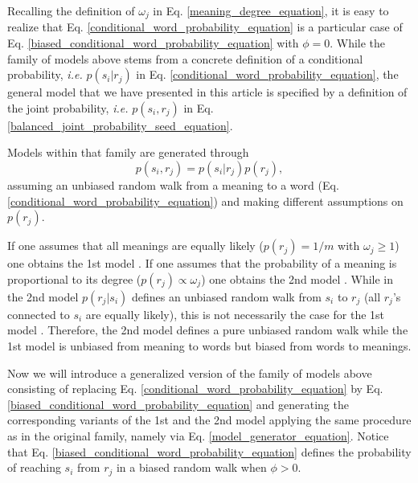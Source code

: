 \documentclass{article}
\begin{document}
Recalling the definition of $\omega_j$ in Eq. \ref{meaning_degree_equation}, it is easy to realize that Eq. \ref{conditional_word_probability_equation} is a particular case of Eq. \ref{biased_conditional_word_probability_equation} with $\phi = 0$. While the family of models above stems from a concrete definition of a conditional probability, {\em i.e.} $p(s_i|r_j)$ in Eq. \ref{conditional_word_probability_equation}, the general model that we have presented in this article is specified by a definition of the joint probability, {\em i.e.} $p(s_i, r_j)$ in Eq. \ref{balanced_joint_probability_seed_equation}.


Models within that family are generated through
\begin{equation}
p(s_i, r_j) = p(s_i | r_j) p(r_j),
\label{model_generator_equation}
\end{equation}
assuming an unbiased random walk from a meaning to a word (Eq. \ref{conditional_word_probability_equation}) and making different assumptions on $p(r_j)$. 

If one assumes that all meanings are equally likely ($p(r_j)=1/m$ with $\omega_j \geq 1$) one obtains the 1st model  \cite{Ferrer2002a}. If one assumes that the probability of a meaning is proportional to its degree ($p(r_j) \propto \omega_j$) one obtains the 2nd model \cite{Ferrer2004e}. While in the 2nd model $p(r_j|s_i)$ defines an unbiased random walk from $s_i$ to $r_j$ (all $r_j$'s connected to $s_i$ are equally likely), this is not necessarily the case for the 1st model \cite{Ferrer2007a}. Therefore, the 2nd model defines a pure unbiased random walk while the 1st model is unbiased from meaning to words but biased from words to meanings. 

Now we will introduce a generalized version of the family of models above consisting of replacing 
Eq. \ref{conditional_word_probability_equation} by Eq. \ref{biased_conditional_word_probability_equation}
and generating the corresponding variants of the 1st and the 2nd model applying the same procedure as in the original family, namely via Eq. \ref{model_generator_equation}. Notice that Eq. \ref{biased_conditional_word_probability_equation} defines the probability of reaching $s_i
$ from $r_j$ in a biased random walk when $\phi > 0$. 
\end{document}
